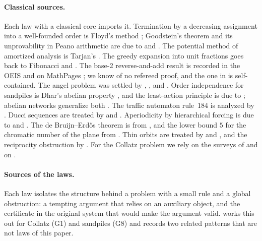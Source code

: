 \paragraph{Classical sources.} Each law with a classical core imports it. Termination by a
decreasing assignment into a well-founded order is Floyd's method \citep{Floyd1967}; Goodstein's
theorem and its unprovability in Peano arithmetic are due to \citet{Goodstein1944} and
\citet{KirbyParis1982}. The potential method of amortized analysis is Tarjan's
\citep{Tarjan1985,CormenEtAl}. The greedy expansion into unit fractions goes back to Fibonacci and
\citet{Sylvester1880}. The base-2 reverse-and-add result is recorded in the OEIS and on MathPages
\citep{OEIS-A060382,Brown-MathPages}; we know of no refereed proof, and the one in
 is self-contained. The angel problem was settled by
\citet{Mathe2007}, \citet{Kloster2007}, \citet{Bowditch2007} and \citet{Gacs2007}. Order
independence for sandpiles is Dhar's abelian property \citep{Dhar1990}, and the least-action
principle is due to \citet{FeyLevinePeres2010}; abelian networks generalize both
\citep{HolroydEtAl2008}. The traffic automaton rule~184 is analyzed by \citet{Fuks1997}. Ducci
sequences are treated by \citet{ChamberlandThomas2004} and \citet{Breuer2007b}. Aperiodicity by
hierarchical forcing is due to \citet{Berger1966} and \citet{Robinson1971}. The de
Bruijn--Erd\H{o}s theorem is from \citet{BruijnErdos1951}, and the lower bound $5$ for the chromatic
number of the plane from \citet{DeGrey2018}. Thin orbits are treated by \citet{BourgainFuchs2010} and
\citet{BourgainKontorovich2014Apollonian}, and the reciprocity obstruction by \citet{HaagEtAl2024}.
For the Collatz problem we rely on the surveys of \citet{Lagarias1985,Lagarias2010} and on
\citet{Tao2019Collatz}.

\paragraph{Sources of the laws.} Each law isolates the structure behind a problem with a small rule
and a global obstruction: a tempting argument that relies on an auxiliary object, and the
certificate in the original system that would make the argument valid.  works
this out for Collatz (G1) and sandpiles (G8) and records two related patterns that are not laws of
this paper.
